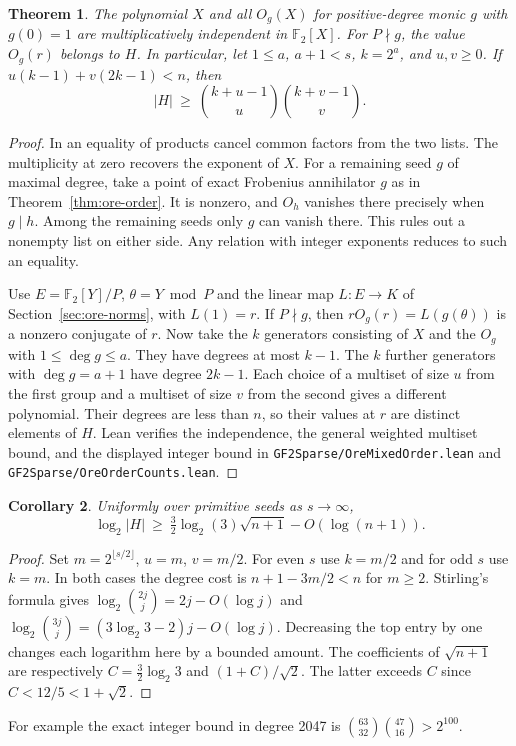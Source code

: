 \documentclass[11pt]{article}
\newtheorem{theorem}{Theorem}
\newtheorem{corollary}[theorem]{Corollary}
\newcommand{\F}{\mathbb F_2}
\begin{document}
\begin{theorem}\label{thm:ore-mixed-order}
The polynomial \(X\) and all \(O_g(X)\) for positive-degree monic
\(g\) with \(g(0)=1\) are multiplicatively independent in \(\F[X]\).
For \(P\nmid g\), the value \(O_g(r)\) belongs to \(H\).
In particular, let \(1\le a\), \(a+1<s\), \(k=2^a\), and
\(u,v\ge0\). If \(u(k-1)+v(2k-1)<n\), then
\[
  |H|\ \ge\ {k+u-1\choose u}{k+v-1\choose v}.
\]
\end{theorem}
\begin{proof}
In an equality of products cancel common factors from the two lists.
The multiplicity at zero recovers the exponent of \(X\).
For a remaining seed \(g\) of maximal degree, take a point of exact
Frobenius annihilator \(g\) as in Theorem~\ref{thm:ore-order}. It is
nonzero, and \(O_h\) vanishes there precisely when \(g\mid h\).
Among the remaining seeds only \(g\) can vanish there. This rules out
a nonempty list on either side. Any relation with integer exponents
reduces to such an equality.

Use \(E=\F[Y]/P\), \(\theta=Y\bmod P\) and the linear map
\(L:E\to K\) of Section~\ref{sec:ore-norms}, with \(L(1)=r\).
If \(P\nmid g\), then \(rO_g(r)=L(g(\theta))\) is a nonzero
conjugate of \(r\). Now take the \(k\) generators consisting of
\(X\) and the \(O_g\) with \(1\le\deg g\le a\). They have degrees
at most \(k-1\). The \(k\) further generators with \(\deg g=a+1\)
have degree \(2k-1\). Each choice of a multiset of size \(u\) from
the first group and a multiset of size \(v\) from the second gives a
different polynomial. Their degrees are less than \(n\), so their
values at \(r\) are distinct elements of \(H\). Lean verifies the
independence, the general weighted multiset bound, and the displayed
integer bound in \nolinkurl{GF2Sparse/OreMixedOrder.lean} and
\nolinkurl{GF2Sparse/OreOrderCounts.lean}.
\end{proof}

\begin{corollary}
Uniformly over primitive seeds as \(s\to\infty\),
\[
 \log_2 |H|\ \ge\ \tfrac32\log_2(3)\sqrt{n+1}-O(\log(n+1)).
\]
\end{corollary}
\begin{proof}
Set \(m=2^{\lfloor s/2\rfloor}\), \(u=m\), \(v=m/2\).
For even \(s\) use \(k=m/2\) and for odd \(s\) use \(k=m\).
In both cases the degree cost is \(n+1-3m/2<n\) for \(m\ge2\).
Stirling's formula gives
\(\log_2\binom{2j}{j}=2j-O(\log j)\) and
\(\log_2\binom{3j}{j}=(3\log_2 3-2)j-O(\log j)\).
Decreasing the top entry by one changes each logarithm here by a
bounded amount. The coefficients of \(\sqrt{n+1}\) are respectively
\(C=\tfrac32\log_2 3\) and \((1+C)/\sqrt 2\).
The latter exceeds \(C\) since \(C<12/5<1+\sqrt2\).
\end{proof}
For example the exact integer bound in degree 2047 is
\(\binom{63}{32}\binom{47}{16}>2^{100}\).
\end{document}
